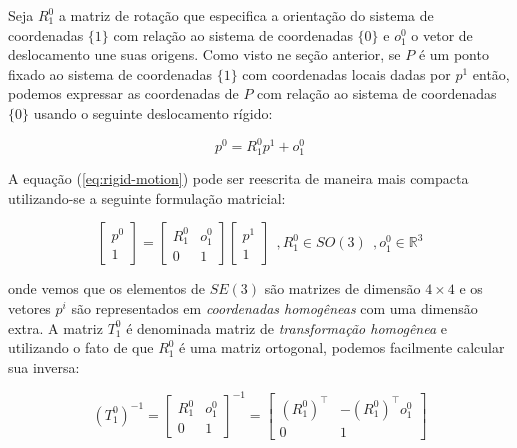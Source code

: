 Seja \(R_1^0\) a matriz de rotação que especifica a orientação do sistema de
coordenadas \(\{1\}\) com relação ao sistema de coordenadas \(\{0\}\) e
\(o_1^0\) o vetor de deslocamento une suas origens. Como visto ne seção
anterior, se \(P\) é um ponto fixado ao sistema de coordenadas \(\{1\}\) com
coordenadas locais dadas por \(p^1\) então, podemos expressar as coordenadas de
\(P\) com relação ao sistema de coordenadas \(\{0\}\) usando o seguinte
deslocamento rígido:

\begin{equation}\label{eq:rigid-motion}
    p^0 = R_1^0 p^1 + o_1^0
\end{equation}

A equação (\ref{eq:rigid-motion}) pode ser reescrita de maneira mais compacta
utilizando-se a seguinte formulação matricial:

\begin{equation}
    \begin{bmatrix}
        p^0 \\
        1
    \end{bmatrix} = \begin{bmatrix}
        R_1^0 & o_1^0 \\
        0     & 1
    \end{bmatrix} \begin{bmatrix}
        p^1 \\
        1
    \end{bmatrix} \ \ , R_1^0 \in SO(3) \ \ , o_1^0 \in \mathbb{R}^3
\end{equation}

onde vemos que os elementos de \(SE(3)\) são matrizes de dimensão \(4 \times
4\) e os vetores \(p^i\) são representados em \emph{coordenadas homogêneas }com
uma dimensão extra. A matriz \(T_1^0\) é denominada matriz de
\emph{transformação homogênea} e utilizando o fato de que \(R_1^0\) é uma
matriz ortogonal, podemos facilmente calcular sua inversa:

\begin{equation}
    {(T_1^0)}^{-1} = \begin{bmatrix}
        R_1^0 & o_1^0 \\
        0     & 1
    \end{bmatrix}^{-1} = \begin{bmatrix}
        {(R_1^0)}^{\top} & -{(R_1^0)}^{\top} o_1^0 \\
        0                & 1
    \end{bmatrix}
\end{equation}


